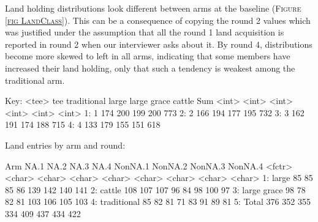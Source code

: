 Land holding distributions look different between arms at the baseline (\textsc{\small Figure \ref{fig LandClass}}). This can be a consequence of copying the round 2 values which was justified under the assumption that all the round 1 land acquisition is reported in round 2 when our interviewer asks about it. %
By round 4, distributions become more skewed to left in all arms, indicating that some members have increased their land holding, only that such a tendency is weakest among the \textsf{traditional} arm. 




\begin{Schunk}
\begin{Soutput}
Key: <tee>
     tee traditional large large grace cattle   Sum
   <int>       <int> <int>       <int>  <int> <int>
1:     1         174   200         199    200   773
2:     2         166   194         177    195   732
3:     3         162   191         174    188   715
4:     4         133   179         155    151   618
\end{Soutput}
\end{Schunk}
Land entries by arm and round:
\begin{Schunk}
\begin{Soutput}
           Arm   NA.1   NA.2   NA.3   NA.4 NonNA.1 NonNA.2 NonNA.3 NonNA.4
        <fctr> <char> <char> <char> <char>  <char>  <char>  <char>  <char>
1:       large     85     85     85     86     139     142     140     141
2:      cattle    108    107    107     96      84      98     100      97
3: large grace     98     78     82     81     103     106     105     103
4: traditional     85     82     81     71      83      91      89      81
5:       Total    376    352    355    334     409     437     434     422
\end{Soutput}
\end{Schunk}


